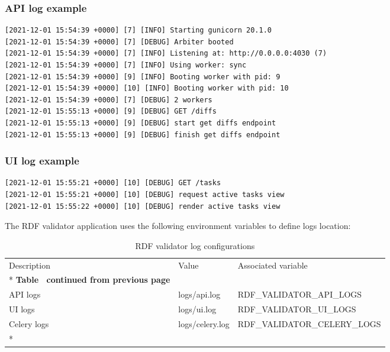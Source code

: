 \subsubsection{API log example}
\begin{lstlisting}
[2021-12-01 15:54:39 +0000] [7] [INFO] Starting gunicorn 20.1.0
[2021-12-01 15:54:39 +0000] [7] [DEBUG] Arbiter booted
[2021-12-01 15:54:39 +0000] [7] [INFO] Listening at: http://0.0.0.0:4030 (7)
[2021-12-01 15:54:39 +0000] [7] [INFO] Using worker: sync
[2021-12-01 15:54:39 +0000] [9] [INFO] Booting worker with pid: 9
[2021-12-01 15:54:39 +0000] [10] [INFO] Booting worker with pid: 10
[2021-12-01 15:54:39 +0000] [7] [DEBUG] 2 workers
[2021-12-01 15:55:13 +0000] [9] [DEBUG] GET /diffs
[2021-12-01 15:55:13 +0000] [9] [DEBUG] start get diffs endpoint
[2021-12-01 15:55:13 +0000] [9] [DEBUG] finish get diffs endpoint
\end{lstlisting}

\subsubsection{UI log example}
\begin{lstlisting}
[2021-12-01 15:55:21 +0000] [10] [DEBUG] GET /tasks
[2021-12-01 15:55:21 +0000] [10] [DEBUG] request active tasks view
[2021-12-01 15:55:22 +0000] [10] [DEBUG] render active tasks view
\end{lstlisting}

The RDF validator application uses the following environment variables to define logs location:

\begin{longtable}[c]{@{}p{3.5cm}p{3.5cm}l@{}}
	\toprule
	Description & Value           & Associated variable          \\* \midrule
	\endfirsthead
	\multicolumn{3}{c}%
	{{\bfseries Table \thetable\ continued from previous page}}  \\
	\endhead
	\bottomrule
	\endfoot
	\endlastfoot
	API logs    & logs/api.log    & RDF\_VALIDATOR\_API\_LOGS    \\
	UI logs     & logs/ui.log     & RDF\_VALIDATOR\_UI\_LOGS     \\
	Celery logs & logs/celery.log & RDF\_VALIDATOR\_CELERY\_LOGS \\* \bottomrule
	\caption{RDF validator log configurations}
	\label{tab:rdf-validator-log}                                   \\
\end{longtable}
